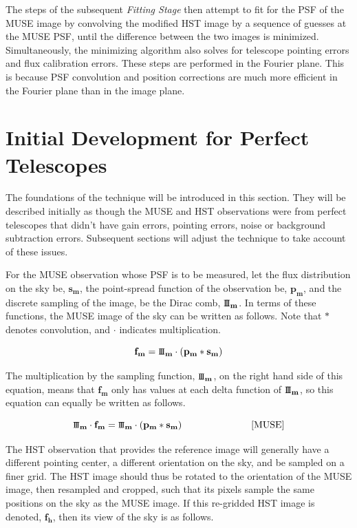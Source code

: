 \documentclass[12pt,twoside,a4paper]{article}
\newcommand{\sha}{\mbox{\small I\!I\!I}}
\newcommand{\msky}{\mathbf{s_m}}
\newcommand{\mpsf}{\mathbf{p_m}}
\newcommand{\mimg}{\mathbf{f_m}}
\newcommand{\himg}{\mathbf{f_h}}
\newcommand{\msha}{\mathbf{\sha_m}}
\begin{document}
The steps of the subsequent \textit{Fitting Stage} then attempt to fit
for the PSF of the MUSE image by convolving the modified HST image by
a sequence of guesses at the MUSE PSF, until the difference between
the two images is minimized. Simultaneously, the minimizing algorithm
also solves for telescope pointing errors and flux calibration
errors. These steps are performed in the Fourier plane. This is
because PSF convolution and position corrections are much more
efficient in the Fourier plane than in the image plane.

\section{Initial Development for Perfect Telescopes}

The foundations of the technique will be introduced in this
section. They will be described initially as though the MUSE and HST
observations were from perfect telescopes that didn't have gain
errors, pointing errors, noise or background subtraction
errors. Subsequent sections will adjust the technique to take account
of these issues.

For the MUSE observation whose PSF is to be measured, let the flux
distribution on the sky be, $\msky$, the point-spread function of the
observation be, $\mpsf$, and the discrete sampling of the image, be
the Dirac comb, $\msha$. In terms of these functions, the MUSE image
of the sky can be written as follows. Note that $\ast$ denotes
convolution, and $\cdot$ indicates multiplication.

\begin{equation}
\mimg = \msha\cdot (\mpsf \ast \msky)
\end{equation}

The multiplication by the sampling function, $\msha$, on the right
hand side of this equation, means that $\mimg$ only has values at each
delta function of $\msha$, so this equation can equally be written as
follows.

\begin{equation}
\label{muse_image_eqn}
\msha \cdot \mimg = \msha\cdot (\mpsf \ast \msky) \hspace{1in} \mbox{[MUSE]}
\end{equation}

The HST observation that provides the reference image will generally
have a different pointing center, a different orientation on the sky,
and be sampled on a finer grid. The HST image should thus be rotated
to the orientation of the MUSE image, then resampled and cropped, such
that its pixels sample the same positions on the sky as the MUSE
image. If this re-gridded HST image is denoted, $\himg$, then its view
of the sky is as follows.
\end{document}
